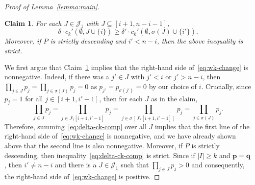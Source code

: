 \documentclass[11pt,a4paper,reqno]{amsart}
\newtheorem{claim}{Claim}
\numberwithin{claim}{thm}
\theoremstyle{definition}
\newcommand{\bp}{\mathbf{p}}
\newcommand{\bq}{\mathbf{q}}
\newcommand{\cJ}{\mathcal{J}}
\renewcommand{\ge}{\geqslant}
\begin{document}
\begin{proof}[{Proof of Lemma~\ref{lemma:main}}]
  \begin{claim}
    \label{claim:delta-ck-comp}
    For each $J \in \cJ_1$ with $J \subseteq [i+1, n-i-1]$,
    \begin{equation}
      \label{eq:delta-ck-comp}
      \delta \cdot c_k'(\emptyset, J \cup \{i\}) \ge \delta' \cdot c_k'(\emptyset, \sigma(J) \cup \{i'\}).
    \end{equation}
    Moreover, if $P$ is strictly descending and $i' < n-i$, then the above inequality is strict.
  \end{claim}
  
  We first argue that Claim~\ref{claim:delta-ck-comp} implies that the right-hand side of~\eqref{eq:wk-change} is nonnegative. Indeed, if there was a $j' \in J$ with $j' < i$ or $j' > n-i$, then $\prod_{j \in J} p_j = \prod_{j \in \sigma(J)} p_j = 0$ as $p_{j'} = p_{\sigma(j')}= 0$ by our choice of $i$. Crucially, since $p_j = 1$ for all $j \in [i+1, i'-1]$, then for each $J$ as in the claim,
  \[
    \prod_{j \in J} p_j = \prod_{j \in J \setminus [i+1, i'-1]} p_j = \prod_{j \in \sigma(J \setminus [i+1, i'-1])} p_j = \prod_{j \in \sigma(J)} p_j.
  \]
  Therefore, summing~\eqref{eq:delta-ck-comp} over all $J$ implies that the first line of the right-hand side of~\eqref{eq:wk-change} is nonnegative, and we have already shown above that the second line is also nonnegative. Moreover, if $P$ is strictly descending, then inequality~\eqref{eq:delta-ck-comp} is strict. Since if $|I| \ge k$ and $\bp = \bq$, then $i' \neq n-i$ and there is a $J \in \cJ_1$ such that $\prod_{j \in J} p_j > 0$ and consequently, the right-hand side of~\eqref{eq:wk-change} is positive.


\end{proof}
\end{document}
